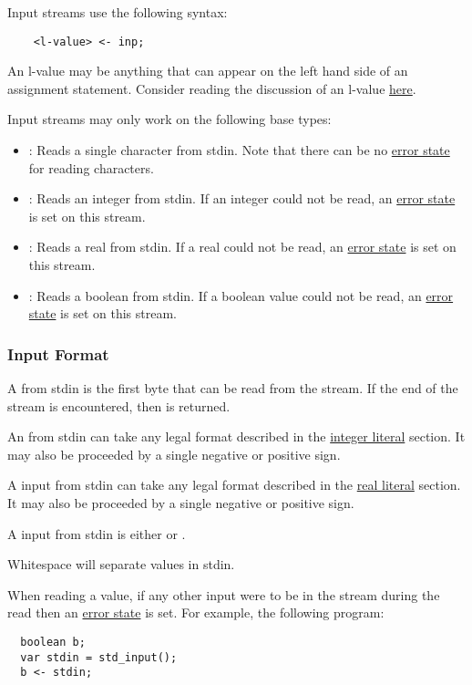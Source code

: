 \documentclass[../gazprea.tex]{subfiles}
\begin{document}
Input streams use the following syntax:
\begin{lstlisting}
	<l-value> <- inp;
\end{lstlisting}

An l-value may be anything that can appear on the left hand side of an assignment statement.
Consider reading the discussion of an l-value
\href{https://en.wikipedia.org/wiki/Value_(computer_science)\#Assignment:_l-values_and_r-values}
{here}.

Input streams may only work on the following base types:
\begin{itemize}
	\item
    : Reads a single character from stdin. Note that there can be no
    \hyperref[sssec:stream_error]{error state} for reading characters.
	\item {}:
    Reads an integer from stdin. If an integer could not be read, an \hyperref[sssec:stream_error]
    {error state} is set on this stream.
	\item {}:
    Reads a real from stdin. If a real could not be read, an \hyperref[sssec:stream_error]{error
    state} is set on this stream.
	\item {}:
    Reads a boolean from stdin. If a boolean value could not be read, an
    \hyperref[sssec:stream_error]{error state} is set on this stream.
\end{itemize}

\subsubsection{Input Format}
\label{sssec:input_format}
A  from stdin is the first byte that can be read from the stream. If the end of the
stream is encountered, then  is returned.

An  from stdin can take any legal format described in the \hyperref[sssec:int_lit]
{integer literal} section. It may also be proceeded by a single negative or positive sign.

A  input from stdin can take any legal format described in the \hyperref[sssec:real_lit]
{real literal} section. It may also be proceeded by a single negative or positive sign.

A  input from stdin is either  or .

Whitespace will separate values in stdin.

When reading a value, if any other input were to be in the stream during the read then an
\hyperref[sssec:stream_error]{error state} is set. For example, the following program:
\begin{lstlisting}
  boolean b;
  var stdin = std_input();
  b <- stdin;
\end{lstlisting}
\end{document}
